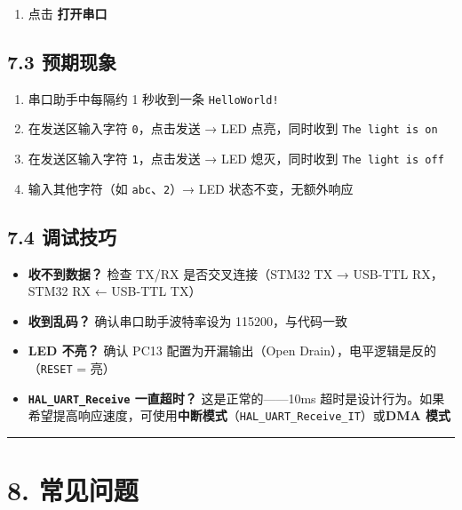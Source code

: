 \documentclass[
  chinese,
  UTF8,
  oneside,
  openany]{ctexbook}
\providecommand{\tightlist}{%
  \setlength{\itemsep}{0pt}\setlength{\parskip}{0pt}}
\begin{document}
\begin{enumerate}
\def\labelenumi{\arabic{enumi}.}
\setcounter{enumi}{3}
\tightlist
\item
  点击 \textbf{打开串口}
\end{enumerate}

\subsection{7.3 预期现象}\label{ux9884ux671fux73b0ux8c61-1}

\begin{enumerate}
\def\labelenumi{\arabic{enumi}.}
\tightlist
\item
  串口助手中每隔约 1 秒收到一条 \texttt{HelloWorld!}
\item
  在发送区输入字符 \texttt{0}，点击发送 → LED 点亮，同时收到
  \texttt{The\ light\ is\ on}
\item
  在发送区输入字符 \texttt{1}，点击发送 → LED 熄灭，同时收到
  \texttt{The\ light\ is\ off}
\item
  输入其他字符（如 \texttt{abc}、\texttt{2}）→ LED 状态不变，无额外响应
\end{enumerate}

\subsection{7.4 调试技巧}\label{ux8c03ux8bd5ux6280ux5de7}

\begin{itemize}
\tightlist
\item
  \textbf{收不到数据？} 检查 TX/RX 是否交叉连接（STM32 TX → USB-TTL
  RX，STM32 RX ← USB-TTL TX）
\item
  \textbf{收到乱码？} 确认串口助手波特率设为 115200，与代码一致
\item
  \textbf{LED 不亮？} 确认 PC13 配置为开漏输出（Open
  Drain），电平逻辑是反的（\texttt{RESET} = 亮）
\item
  \textbf{\texttt{HAL\_UART\_Receive} 一直超时？} 这是正常的------10ms
  超时是设计行为。如果希望提高响应速度，可使用\textbf{中断模式}（\texttt{HAL\_UART\_Receive\_IT}）或\textbf{DMA
  模式}
\end{itemize}

\begin{center}\rule{0.5\linewidth}{0.5pt}\end{center}

\section{8. 常见问题}\label{ux5e38ux89c1ux95eeux9898}
\end{document}
